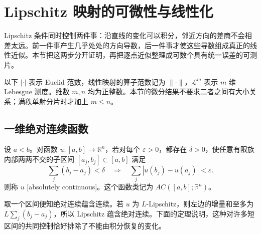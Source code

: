 
% 
% 

\section{Lipschitz 映射的可微性与线性化}
\label{g3:sec:2002}

Lipschitz 条件同时控制两件事：沿直线的变化可以积分，邻近方向的差商不会相差太远。前一件事产生几乎处处的方向导数，后一件事才使这些导数组成真正的线性近似。本节把这两步分开证明，再把逐点近似整理成可数个具有统一误差的可测片。

\ProseParagraphBreak
以下 \(|\cdot|\) 表示 Euclid 范数，线性映射的算子范数记为 \(\|\cdot\|\)，\(\mathcal L^m\) 表示 \(m\) 维 Lebesgue 测度。维数 \(m,n\) 均为正整数。本节的微分结果不要求二者之间有大小关系；满秩单射分片时才加上 \(m\le n\)。

\subsection{一维绝对连续函数}
\label{g3:subsec:2002:01}
\begin{definition}\label{g3:def:absolute-continuity-interval}
	设 \(a<b\)。对函数 \(u:[a,b]\to\mathbb R^n\)，若对每个 \(\varepsilon>0\)，都存在 \(\delta>0\)，使任意有限族内部两两不交的子区间 \([a_j,b_j]\subset[a,b]\) 满足
	\[
		\sum_j(b_j-a_j)<\delta
		\quad\Longrightarrow\quad
		\sum_j|u(b_j)-u(a_j)|<\varepsilon.
	\]
	则称 \(u\) [absolutely continuous]。这个函数类记为 \(AC([a,b];\mathbb R^n)\)。
\end{definition}

取一个区间便知绝对连续蕴含连续。若 \(u\) 为 \(L\)-Lipschitz，则左边的增量和至多为 \(L\sum_j(b_j-a_j)\)，所以 Lipschitz 蕴含绝对连续。下面的定理说明，这种对许多短区间的共同控制恰好排除了不能由积分恢复的变化。

